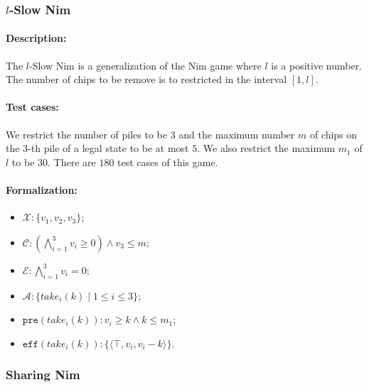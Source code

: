 \documentclass[review]{elsarticle}
\newcommand{\set}[1]{\{ #1 \}}
\newcommand{\tuple}[1]{\langle {#1} \rangle}
\newcommand{\true}{\top}
\newcommand{\statevar}{\mathcal{X}}
\newcommand{\act}{\mathcal{A}}
\newcommand{\constraint}{\mathcal{C}}
\newcommand{\estate}{\mathcal{E}}
\newcommand{\pre}{\mathtt{pre}}
\newcommand{\eff}{\mathtt{eff}}
\begin{document}
\subsubsection{$l$-Slow Nim \protect\cite{AhnCCEFGGKMPS2017}}

\paragraph{Description:} 
The $l$-Slow Nim is a generalization of the Nim game where $l$ is a positive number.
The number of chips to be remove is to restricted in the interval $[1, l]$.

\paragraph{Test cases:}
We restrict the number of piles to be $3$ and the maximum number $m$ of chips on the 3-th pile of a legal state to be at most $5$.
We also restrict the maximum $m_1$ of $l$ to be $30$.
There are $180$ test cases of this game.



\paragraph{Formalization:}

\begin{itemize}
	\item $\statevar: \set{v_1, v_2, v_3} $;
	\item $\constraint: (\bigwedge_{i=1}^{3} v_i \ge 0) \wedge v_3 \le m$;
	\item $\estate: \bigwedge_{i=1}^{3} v_i = 0$;
	\item $\act:\set{take_i(k) {\mid} 1 \le i \le 3}$;
	\item $\pre(take_i(k)) : v_i \ge k \wedge  k \le m_1$;
	\item $\eff(take_i(k)) :  \set{\tuple{\true, v_i, v_i - k}}$.
\end{itemize}


\subsubsection{Sharing Nim \protect\cite{Ho2016}}
\end{document}
